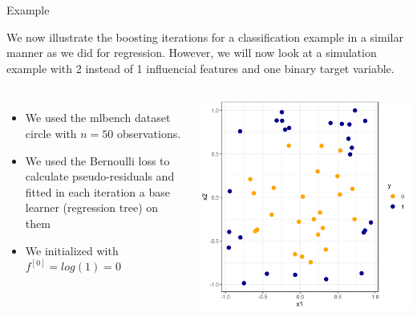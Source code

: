 \begin{vbframe}{Example}

We now illustrate the boosting iterations for a classification example in a similar manner as we did for regression.
However, we will now look at a simulation example with 2 instead of 1 influencial features and one binary target variable.

\begin{columns}
\column{5.5cm}
\begin{itemize}
\item We used the mlbench dataset circle with $n = 50$ observations.
\item We used the Bernoulli loss to calculate pseudo-residuals and fitted in each iteration a base learner (regression tree) on them
\item We initialized with $f^{[0]} = log(1) = 0$
\end{itemize}
\column{4.5cm}
\begin{center}
\includegraphics[width=\textwidth]{figure_man/boosting_classif_example.png}
\end{center}

\end{columns}



\end{vbframe}

